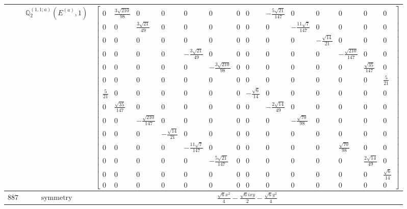 \documentclass[fleqn,8pt,landscape]{jsarticle}
\begin{document}
\begin{longtable}{ccc}
$  $ & $ \mathbb{Q}_{2}^{(1,1;a)}(E^{(a)},1) $ & $ \begin{bmatrix} 0 & \frac{3 \sqrt{210}}{98} & 0 & 0 & 0 & 0 & 0 & 0 & - \frac{5 \sqrt{21}}{147} & 0 & 0 & 0 & 0 & 0 \\ 0 & 0 & \frac{3 \sqrt{21}}{49} & 0 & 0 & 0 & 0 & 0 & 0 & - \frac{11 \sqrt{7}}{147} & 0 & 0 & 0 & 0 \\ 0 & 0 & 0 & 0 & 0 & 0 & 0 & 0 & 0 & 0 & - \frac{\sqrt{14}}{21} & 0 & 0 & 0 \\ 0 & 0 & 0 & 0 & - \frac{3 \sqrt{21}}{49} & 0 & 0 & 0 & 0 & 0 & 0 & - \frac{\sqrt{210}}{147} & 0 & 0 \\ 0 & 0 & 0 & 0 & 0 & - \frac{3 \sqrt{210}}{98} & 0 & 0 & 0 & 0 & 0 & 0 & \frac{\sqrt{35}}{147} & 0 \\ 0 & 0 & 0 & 0 & 0 & 0 & 0 & 0 & 0 & 0 & 0 & 0 & 0 & \frac{5}{21} \\ \frac{5}{21} & 0 & 0 & 0 & 0 & 0 & 0 & - \frac{\sqrt{6}}{14} & 0 & 0 & 0 & 0 & 0 & 0 \\ 0 & \frac{\sqrt{35}}{147} & 0 & 0 & 0 & 0 & 0 & 0 & - \frac{2 \sqrt{14}}{49} & 0 & 0 & 0 & 0 & 0 \\ 0 & 0 & - \frac{\sqrt{210}}{147} & 0 & 0 & 0 & 0 & 0 & 0 & - \frac{\sqrt{70}}{98} & 0 & 0 & 0 & 0 \\ 0 & 0 & 0 & - \frac{\sqrt{14}}{21} & 0 & 0 & 0 & 0 & 0 & 0 & 0 & 0 & 0 & 0 \\ 0 & 0 & 0 & 0 & - \frac{11 \sqrt{7}}{147} & 0 & 0 & 0 & 0 & 0 & 0 & \frac{\sqrt{70}}{98} & 0 & 0 \\ 0 & 0 & 0 & 0 & 0 & - \frac{5 \sqrt{21}}{147} & 0 & 0 & 0 & 0 & 0 & 0 & \frac{2 \sqrt{14}}{49} & 0 \\ 0 & 0 & 0 & 0 & 0 & 0 & 0 & 0 & 0 & 0 & 0 & 0 & 0 & \frac{\sqrt{6}}{14} \\ 0 & 0 & 0 & 0 & 0 & 0 & 0 & 0 & 0 & 0 & 0 & 0 & 0 & 0 \end{bmatrix} $ \\ \hline
$ 887 $ & $ \text{symmetry} $ & $ \frac{\sqrt{6} x^{2}}{4} - \frac{\sqrt{6} i x y}{2} - \frac{\sqrt{6} y^{2}}{4} $ \\

\end{longtable}
\end{document}
